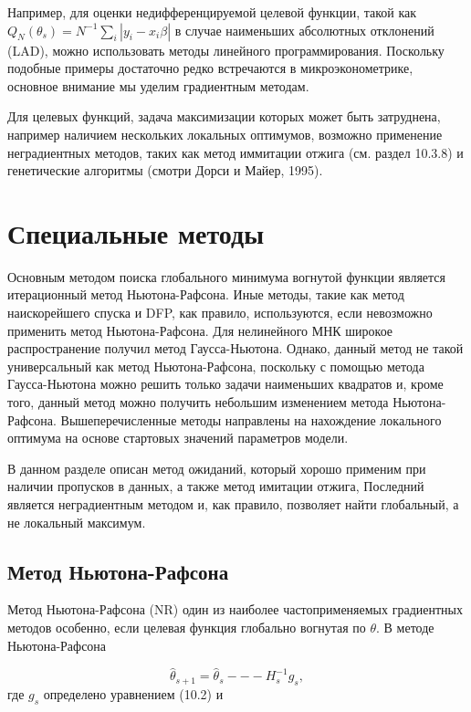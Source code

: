 Например, для оценки недифференцируемой целевой функции, такой как $Q_N(\theta_s)=N^{-1}\sum_i|y_i-x_i\beta|$ в случае наименьших абсолютных отклонений (LAD), можно использовать методы линейного программирования. Поскольку подобные примеры достаточно редко встречаются в микроэконометрике, основное внимание мы уделим градиентным методам.

Для целевых функций, задача максимизации которых может быть затруднена, например наличием нескольких локальных оптимумов, возможно применение неградиентных методов, таких как метод иммитации отжига (см. раздел 10.3.8) и генетические алгоритмы (смотри Дорси и Майер, 1995).

\section{Специальные методы}

Основным методом поиска глобального минимума вогнутой функции является итерационный метод Ньютона-Рафсона. Иные методы, такие как метод наискорейшего спуска и DFP, как правило, используются, если невозможно применить метод Ньютона-Рафсона. Для нелинейного МНК широкое распространение получил метод Гаусса-Ньютона. Однако, данный метод не такой универсальный  как  метод Ньютона-Рафсона, поскольку с помощью метода Гаусса-Ньютона можно решить только задачи наименьших квадратов и, кроме того, данный метод можно получить небольшим изменением метода Ньютона-Рафсона. Вышеперечисленные методы направлены на нахождение локального оптимума на основе стартовых значений параметров модели.

В данном разделе описан метод ожиданий, который хорошо применим при наличии пропусков в данных, а также метод имитации отжига, Последний является неградиентным методом и, как правило, позволяет найти глобальный, а не локальный максимум.


\subsection{Метод Ньютона-Рафсона}

Метод Ньютона-Рафсона (NR) один из наиболее частоприменяемых градиентных методов особенно, если целевая функция глобально вогнутая по $\theta$. В  методе Ньютона-Рафсона

\begin{equation}
\hat{\theta}_{s+1} = \hat{\theta}_s --- H^{-1}_sg_s,
\end{equation}
где $g_s$ определено уравнением (10.2) и

